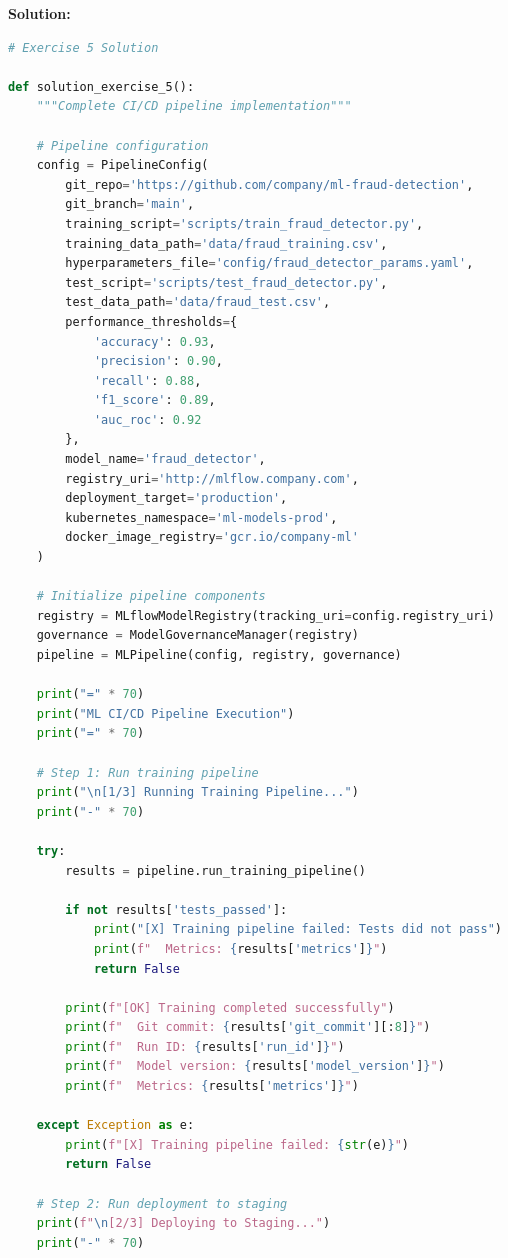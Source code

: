 \textbf{Solution:}
\begin{lstlisting}[language=Python]
# Exercise 5 Solution

def solution_exercise_5():
    """Complete CI/CD pipeline implementation"""

    # Pipeline configuration
    config = PipelineConfig(
        git_repo='https://github.com/company/ml-fraud-detection',
        git_branch='main',
        training_script='scripts/train_fraud_detector.py',
        training_data_path='data/fraud_training.csv',
        hyperparameters_file='config/fraud_detector_params.yaml',
        test_script='scripts/test_fraud_detector.py',
        test_data_path='data/fraud_test.csv',
        performance_thresholds={
            'accuracy': 0.93,
            'precision': 0.90,
            'recall': 0.88,
            'f1_score': 0.89,
            'auc_roc': 0.92
        },
        model_name='fraud_detector',
        registry_uri='http://mlflow.company.com',
        deployment_target='production',
        kubernetes_namespace='ml-models-prod',
        docker_image_registry='gcr.io/company-ml'
    )

    # Initialize pipeline components
    registry = MLflowModelRegistry(tracking_uri=config.registry_uri)
    governance = ModelGovernanceManager(registry)
    pipeline = MLPipeline(config, registry, governance)

    print("=" * 70)
    print("ML CI/CD Pipeline Execution")
    print("=" * 70)

    # Step 1: Run training pipeline
    print("\n[1/3] Running Training Pipeline...")
    print("-" * 70)

    try:
        results = pipeline.run_training_pipeline()

        if not results['tests_passed']:
            print("[X] Training pipeline failed: Tests did not pass")
            print(f"  Metrics: {results['metrics']}")
            return False

        print(f"[OK] Training completed successfully")
        print(f"  Git commit: {results['git_commit'][:8]}")
        print(f"  Run ID: {results['run_id']}")
        print(f"  Model version: {results['model_version']}")
        print(f"  Metrics: {results['metrics']}")

    except Exception as e:
        print(f"[X] Training pipeline failed: {str(e)}")
        return False

    # Step 2: Run deployment to staging
    print(f"\n[2/3] Deploying to Staging...")
    print("-" * 70)


\end{lstlisting}

